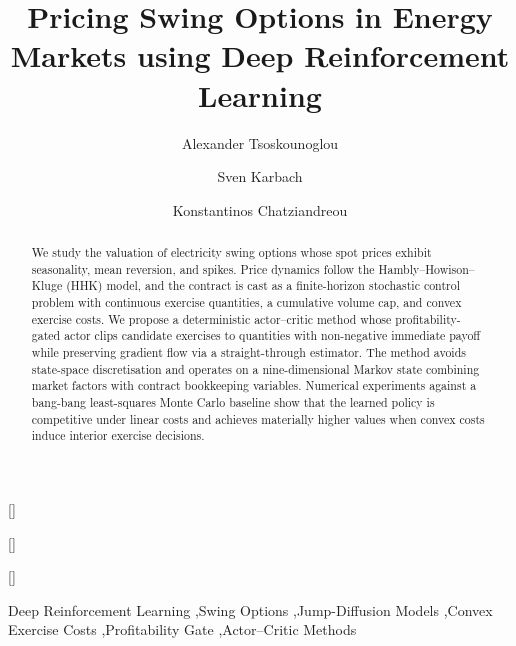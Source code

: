 \documentclass[a4paper,fleqn]{cas-dc}
\begin{document}

\title[mode=title]{Pricing Swing Options in Energy Markets using Deep Reinforcement Learning}

\author[1]{Alexander Tsoskounoglou}[]

\author[2,3]{Sven Karbach}[]

\author[2,3]{Konstantinos Chatziandreou}[]




\begin{abstract}
We study the valuation of electricity swing options whose spot prices exhibit seasonality, mean reversion, and spikes. Price dynamics follow the Hambly--Howison--Kluge (HHK) model, and the contract is cast as a finite-horizon stochastic control problem with continuous exercise quantities, a cumulative volume cap, and convex exercise costs. We propose a deterministic actor--critic method whose profitability-gated actor clips candidate exercises to quantities with non-negative immediate payoff while preserving gradient flow via a straight-through estimator. The method avoids state-space discretisation and operates on a nine-dimensional Markov state combining market factors with contract bookkeeping variables. Numerical experiments against a bang-bang least-squares Monte Carlo baseline show that the learned policy is competitive under linear costs and achieves materially higher values when convex costs induce interior exercise decisions.
\end{abstract}

\begin{keywords}
Deep Reinforcement Learning \sep Swing Options \sep Jump-Diffusion Models \sep Convex Exercise Costs \sep Profitability Gate \sep Actor--Critic Methods
\end{keywords}
\end{document}
